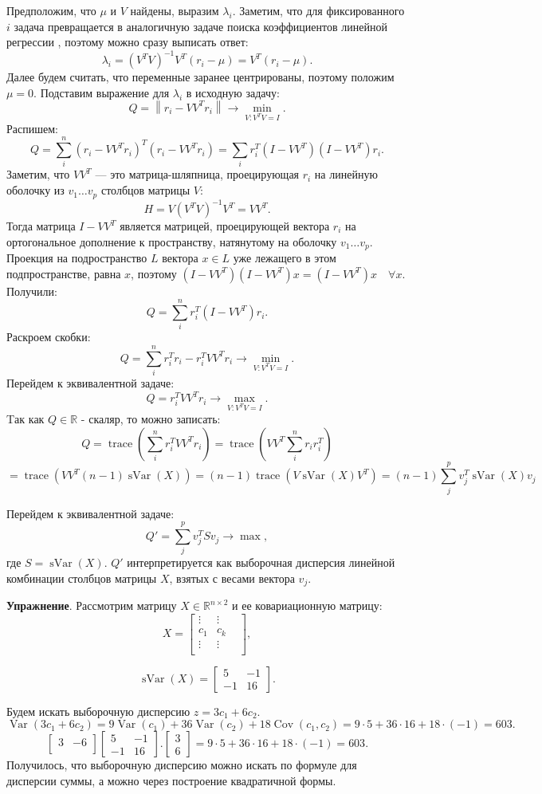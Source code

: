 \documentclass[12pt]{article} %
\theoremstyle{definition} %
\DeclareMathOperator{\Cov}{Cov}
\DeclareMathOperator{\sVar}{sVar}
\DeclareMathOperator{\Var}{Var}
\DeclareMathOperator{\tr}{trace}
\def \RR{\mathbb{R}}
\begin{document}
Предположим, что \(\mu\) и \(V\) найдены, выразим \(\lambda_i\). Заметим, что для фиксированного \(i\) задача превращается в аналогичную задаче поиска коэффициентов линейной регрессии , поэтому можно сразу выписать ответ:
\[\lambda_i = (V^TV)^{-1}V^T(r_i-\mu) = V^T(r_i-\mu).\]
Далее будем считать, что переменные заранее центрированы, поэтому положим \(\mu=0\).
Подставим выражение для \(\lambda_i\) в исходную задачу:
\[Q = \left\| r_i - VV^T r_i \right\| \to \min_{V: V^TV=I} .\]
Распишем:
\[Q = \sum_i^n (r_i - VV^Tr_i)^T (r_i - VV^Tr_i) =
\sum_i r_i^T (I-VV^T)(I-VV^T)r_i.\]
Заметим, что \(VV^T\)  —  это матрица-шляпница, проецирующая \(r_i\) на линейную оболочку из \(v_1 \dots v_p\) столбцов матрицы \(V\):
\[ H = V (V^TV)^{-1} V^T = VV^T.\]
Тогда матрица \( I-VV^T \) является матрицей, проецирующей вектора \(r_i\) на ортогональное дополнение к пространству, натянутому на оболочку \(v_1 \dots v_p\).
Проекция на подространство \(L\) вектора \(x \in L\) уже лежащего в этом подпространстве, равна \(x\), поэтому  \( (I-VV^T)(I-VV^T)x=(I-VV^T)x \quad \forall x\).
Получили:
\[ Q = \sum_i^n r_i^T(I - VV^T)r_i. \]
Раскроем скобки:
\[Q = \sum_i^n r_i^T r_i - r_i^T VV^T r_i \to \min_{V: V^TV=I}.\]
Перейдем к эквивалентной задаче:
\[Q=r_i^T VV^T r_i \to \max_{V: V^TV=I}.\]
Tак как \(Q \in \RR\) - скаляр, то можно записать:
\[Q = \tr (\sum_i^n r_i^T VV^T r_i ) =
 \tr (VV^T \sum_i^n r_i r_i^T) \]
 \[
 = \tr (VV^T (n-1)\sVar(X))=
 (n-1)\tr (V \sVar(X) V^T )
 = (n-1) \sum_{j}^p v_j^T \sVar(X) v_j \]

Перейдем к эквивалентной задаче:
\[Q' = \sum_{j}^p v_j^T S v_j \to \max,\]
где \(S = \sVar(X)\). \(Q'\) интерпретируется как выборочная дисперсия линейной комбинации столбцов матрицы \(X\), взятых с весами вектора \(v_j\).

\textbf{Упражнение}. Рассмотрим матрицу \(X \in \RR^{n \times 2}\) и ее ковариационную матрицу:
\[
X = \begin{bmatrix}
    \vdots & \vdots & \\
    c_1 &  c_k \\
    \vdots &   \vdots & \\
    \end{bmatrix},
\]

\[
\sVar(X) =
\begin{bmatrix}
5 & -1 \\
-1 & 16
\end{bmatrix}.
\]


Будем искать выборочную дисперсию \(z = 3c_1 + 6c_2\).
\[ \Var(3c_1+6c_2)=9\Var(c_1) + 36 \Var(c_2) + 18 \Cov(c_1, c_2) = 9 \cdot 5 + 36 \cdot 16 + 18 \cdot (-1) = 603.\]
\[
\begin{bmatrix}
3 & -6 \\
\end{bmatrix}
\begin{bmatrix}
5 & -1 \\
-1 & 16
\end{bmatrix}.
\begin{bmatrix}
3\\
6
\end{bmatrix}=9 \cdot 5 + 36 \cdot 16 + 18 \cdot (-1) = 603.
\]
Получилось, что выборочную дисперсию можно искать по формуле для дисперсии суммы, а можно через построение квадратичной формы.
\end{document}
